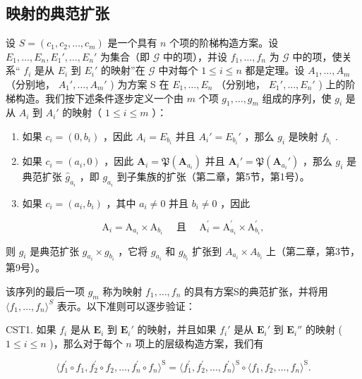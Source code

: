 \subsection{映射的典范扩张}

设 \(S = (c_1, c_2, \ldots, c_m)\) 是一个具有 \(n\) 个项的阶梯构造方案。设 \(E_1, \ldots, E_n, E_1', \ldots, E_n'\) 为集合（即 \(\mathcal{G}\) 中的项），并设 \(f_1, \ldots, f_n\) 为 \(\mathcal{G}\) 中的项，使关系“ \(f_i\) 是从 \(E_i\) 到 \(E_i'\) 的映射”在 \(\mathcal{G}\) 中对每个 \(1 \leqslant i \leqslant n\) 都是定理。设 \(A_1, \ldots, A_m\) （分别地， \(A_1', \ldots, A_m'\) ) 为方案 S 在 \(E_1, \ldots, E_n\) （分别地， \(E_1', \ldots, E_n'\) ) 上的阶梯构造。我们按下述条件逐步定义一个由 \(m\) 个项 \(g_1, \ldots, g_m\) 组成的序列，使 \(g_i\) 是从 \(A_i\) 到 \(A_i'\) 的映射（ \(1 \leqslant i \leqslant m\) ）：

\begin{enumerate}
\def\labelenumi{(\alph{enumi})}
\item
  如果 \(c_{i} = (0, b_{i})\) ，因此 \(A_{i} = E_{b_{i}}\) 并且 \(A_{i}' = E_{b_{i}}'\) ，那么 \(g_{i}\) 是映射 \(f_{b_{i}}\) .
\item
  如果 \(c_{i} = (a_{i}, 0)\) ，因此 \(\mathbf{A}_{i} = \mathfrak{P}(\mathbf{A}_{a_{i}})\) 并且 \(\mathbf{A}_{i}' = \mathfrak{P}(\mathbf{A}_{a_{i}}')\) ，那么 \(g_{i}\) 是典范扩张 \(\hat{g}_{a_i}\) ，即 \(g_{a_i}\) 到子集族的扩张（第二章，第5节，第1号）。
\item
  如果 \(c_{i} = (a_{i}, b_{i})\) ，其中 \(a_{i} \neq 0\) 并且 \(b_{i} \neq 0\) ，因此
\end{enumerate}

\[
\mathrm{A} _ {i} = \mathrm{A} _ {a _ {i}} \times \mathrm{A} _ {b _ {i}} \quad \text { 且 } \quad \mathrm{A} _ {i} ^ {\prime} = \mathrm{A} _ {a _ {i}} ^ {\prime} \times \mathrm{A} _ {b _ {i}} ^ {\prime},
\]

则 \(g_{i}\) 是典范扩张 \(g_{a_i} \times g_{b_i}\) ，它将 \(g_{a_i}\) 和 \(g_{b_i}\) 扩张到 \(A_{a_i} \times A_{b_i}\) 上（第二章，第3节，第9号）。

该序列的最后一项 \(g_{m}\) 称为映射 \(f_{1}, \ldots, f_{n}\) 的具有方案S的典范扩张，并将用 \(\langle f_{1}, \ldots, f_{n} \rangle^{S}\) 表示。以下准则可以逐步验证：

CST1. 如果 \(f_{i}\) 是从 \(\mathbf{E}_i\) 到 \(\mathbf{E}_i'\) 的映射，并且如果 \(f_{i}'\) 是从 \(\mathbf{E}_i'\) 到 \(\mathbf{E}_i''\) 的映射 ( \(1 \leqslant i \leqslant n\) )，那么对于每个 \(n\) 项上的层级构造方案，我们有

\[
\langle f _ {1} ^ {\prime} \circ f _ {1}, f _ {2} ^ {\prime} \circ f _ {2}, \dots , f _ {n} ^ {\prime} \circ f _ {n} \rangle^ {\mathrm{S}} = \langle f _ {1} ^ {\prime}, f _ {2} ^ {\prime}, \dots , f _ {n} ^ {\prime} \rangle^ {\mathrm{S}} \circ \langle f _ {1}, f _ {2}, \dots , f _ {n} \rangle^ {\mathrm{S}}.
\]

